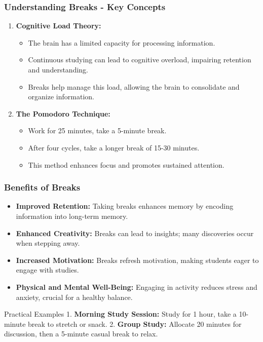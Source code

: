 \documentclass[aspectratio=169]{beamer}
\begin{document}
\begin{frame}[fragile]
    \frametitle{Understanding Breaks - Key Concepts}
    \begin{enumerate}
        \item \textbf{Cognitive Load Theory:} 
        \begin{itemize}
            \item The brain has a limited capacity for processing information.
            \item Continuous studying can lead to cognitive overload, impairing retention and understanding.
            \item Breaks help manage this load, allowing the brain to consolidate and organize information.
        \end{itemize}
        
        \item \textbf{The Pomodoro Technique:}
        \begin{itemize}
            \item Work for 25 minutes, take a 5-minute break.
            \item After four cycles, take a longer break of 15-30 minutes.
            \item This method enhances focus and promotes sustained attention.
        \end{itemize}
    \end{enumerate}
\end{frame}

\begin{frame}[fragile]
    \frametitle{Benefits of Breaks}
    \begin{itemize}
        \item \textbf{Improved Retention:} Taking breaks enhances memory by encoding information into long-term memory.
        \item \textbf{Enhanced Creativity:} Breaks can lead to insights; many discoveries occur when stepping away.
        \item \textbf{Increased Motivation:} Breaks refresh motivation, making students eager to engage with studies.
        \item \textbf{Physical and Mental Well-Being:} Engaging in activity reduces stress and anxiety, crucial for a healthy balance.
    \end{itemize}
    
    \begin{block}{Practical Examples}
        1. \textbf{Morning Study Session:} Study for 1 hour, take a 10-minute break to stretch or snack.
        2. \textbf{Group Study:} Allocate 20 minutes for discussion, then a 5-minute casual break to relax.
    \end{block}
\end{frame}
\end{document}
